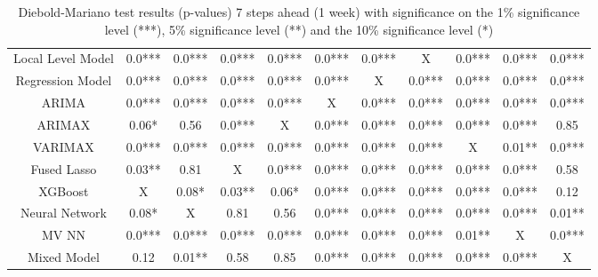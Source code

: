 \begin{landscape}
\begin{table}[]
\begin{tabular}{|c|c c c c c c c c c c|}
        Local Level Model & 0.0*** & 0.0*** & 0.0*** & 0.0*** & 0.0*** & 0.0*** & X & 0.0*** & 0.0*** & 0.0***\\
        Regression Model & 0.0*** & 0.0*** & 0.0*** & 0.0*** & 0.0*** & X & 0.0*** & 0.0*** & 0.0*** & 0.0***\\
        ARIMA & 0.0*** & 0.0*** & 0.0*** & 0.0*** & X & 0.0*** & 0.0*** & 0.0*** & 0.0*** & 0.0***\\
        ARIMAX & 0.06* & 0.56 & 0.0*** & X & 0.0*** & 0.0*** & 0.0*** & 0.0*** & 0.0*** & 0.85\\
        VARIMAX & 0.0*** & 0.0*** & 0.0*** & 0.0*** & 0.0*** & 0.0*** & 0.0*** & X & 0.01** & 0.0***\\
        Fused Lasso & 0.03** & 0.81 & X & 0.0*** & 0.0*** & 0.0*** & 0.0*** & 0.0*** & 0.0*** & 0.58\\
        XGBoost & X & 0.08* & 0.03** & 0.06* & 0.0*** & 0.0*** & 0.0*** & 0.0*** & 0.0*** & 0.12\\
        Neural Network & 0.08* & X & 0.81 & 0.56 & 0.0*** & 0.0*** & 0.0*** & 0.0*** & 0.0*** & 0.01**\\
        MV NN & 0.0*** & 0.0*** & 0.0*** & 0.0*** & 0.0*** & 0.0*** & 0.0*** & 0.01** & X & 0.0***\\
        Mixed Model & 0.12 & 0.01** & 0.58 & 0.85 & 0.0*** & 0.0*** & 0.0*** & 0.0*** & 0.0*** & X\\
    \hline
    \end{tabular}
    \caption{Diebold-Mariano test results (p-values) 7 steps ahead (1 week) with significance on the 1\% significance level (***), 5\% significance level (**) and the 10\% significance level (*)}
    \label{tab:1 week ahead diebold}
\end{table}
\end{landscape}

